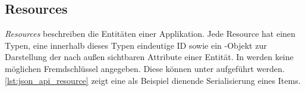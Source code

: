 \subsection{Resources}
\label{sec:gj_resources}

\emph{Resources} beschreiben die Entitäten einer
Applikation.  Jede Resource hat einen Typen, eine innerhalb dieses Typen
eindeutige ID sowie ein -Objekt zur Darstellung der nach außen
sichtbaren Attribute einer Entität.  In  werden keine möglichen
Fremdschlüssel angegeben.  Diese können unter  aufgeführt
werden.  \cref{lst:json_api_resource} zeigt eine als Beispiel dienende
Serialisierung eines Items.


